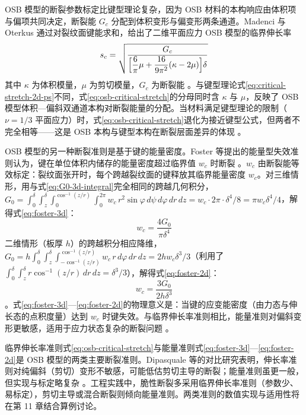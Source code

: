 OSB 模型的断裂参数标定比键型理论复杂，因为 OSB 材料的本构响应由体积项与偏项共同决定，断裂能 $G_{c}$ 分配到体积变形与偏变形两条通道。Madenci 与 Oterkus 通过对裂纹面键能求和，给出了二维平面应力 OSB 模型的临界伸长率 \cite{MadenciOterkus2014,Karpenko2020}
\begin{equation}
  s_{c}=\sqrt{\frac{G_{c}}{\Bigl[\dfrac{6}{\pi}\mu+\dfrac{16}{9\pi^{2}}(\kappa-2\mu)\Bigr]\delta}}
  \label{eq:osb-critical-stretch}
\end{equation}
其中 $\kappa$ 为体积模量，$\mu$ 为剪切模量，$G_{c}$ 为断裂能 \cite{Karpenko2020}。与键型理论式\eqref{eq:critical-stretch-2d-ps}不同，式\eqref{eq:osb-critical-stretch}的分母同时含 $\kappa$ 与 $\mu$，反映了 OSB 模型体积—偏斜双通道本构对断裂能量的分配。当材料满足键型理论的限制（$\nu=1/3$ 平面应力）时，式\eqref{eq:osb-critical-stretch}退化为接近键型公式，但两者不完全相等——这是 OSB 本构与键型本构在断裂层面差异的体现 \cite{Karpenko2020}。

OSB 模型的另一种断裂准则是基于键的能量密度。Foster 等提出的能量型失效准则认为，键在单位体积内储存的能量密度超过临界值 $w_{c}$ 时断裂 \cite{Foster2011}。$w_{c}$ 由断裂能等效标定：裂纹面张开时，每个跨越裂纹面的键释放其临界能量密度 $w_{c}$。对三维情形，用与式\eqref{eq:G0-3d-integral}完全相同的跨越几何积分，$G_{0}=\int_{0}^{\delta}\int_{z}^{\delta}\int_{0}^{\cos^{-1}(z/r)}\int_{0}^{2\pi}w_{c}\,r^{2}\sin\varphi\,d\psi\,d\varphi\,dr\,dz=w_{c}\cdot 2\pi\cdot\delta^{4}/8=\pi w_{c}\delta^{4}/4$，解得式\eqref{eq:foster-3d}：
\begin{equation}
  w_{c}=\frac{4G_{0}}{\pi\delta^{4}}
  \label{eq:foster-3d}
\end{equation}
二维情形（板厚 $h$）的跨越积分相应降维，$G_{0}=h\int_{0}^{\delta}\int_{z}^{\delta}\int_{-\cos^{-1}(z/r)}^{\cos^{-1}(z/r)}w_{c}\,r\,d\varphi\,dr\,dz=2hw_{c}\delta^{3}/3$（利用了 $\int_{0}^{\delta}\int_{z}^{\delta}r\cos^{-1}(z/r)\,dr\,dz=\delta^{3}/3$），解得式\eqref{eq:foster-2d}：
\begin{equation}
  w_{c}=\frac{3G_{0}}{2h\delta^{3}}
  \label{eq:foster-2d}
\end{equation}
\cite{ButtMeschke2021}。式\eqref{eq:foster-3d}—\eqref{eq:foster-2d}的物理意义是：当键的应变能密度（由力态与伸长态的点积度量）达到 $w_{c}$ 时键失效。与临界伸长率准则相比，能量准则对偏斜变形更敏感，适用于应力状态复杂的断裂问题 \cite{Dipasquale2017,Foster2011}。

\begin{remark}
  临界伸长率准则式\eqref{eq:osb-critical-stretch}与能量准则式\eqref{eq:foster-3d}—\eqref{eq:foster-2d}是 OSB 模型的两类主要断裂准则。Dipasquale 等的对比研究表明，伸长率准则对纯偏斜（剪切）变形不敏感，可能低估剪切主导的断裂；能量准则虽更一般，但实现与标定略复杂 \cite{Dipasquale2017}。工程实践中，脆性断裂多采用临界伸长率准则（参数少、易标定），剪切主导或混合断裂则倾向能量准则。两类准则的数值实现与适用性将在第 11 章结合算例讨论。
\end{remark}

